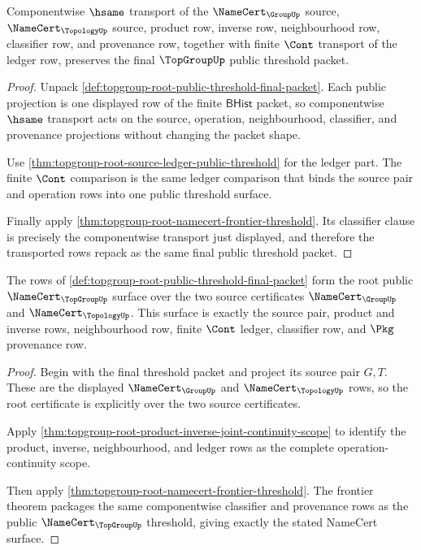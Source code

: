 \begin{theorem}
\label{thm:topgroup-root-public-threshold-transport}
Componentwise $\hsame$ transport of the $\NameCert_{\GroupUp}$ source,
$\NameCert_{\TopologyUp}$ source, product row, inverse row, neighbourhood row,
classifier row, and provenance row, together with finite $\Cont$ transport of
the ledger row, preserves the final $\TopGroupUp$ public threshold packet.
\end{theorem}
\begin{proof}
Unpack \autoref{def:topgroup-root-public-threshold-final-packet}. Each public
projection is one displayed row of the finite $\mathsf{BHist}$ packet, so
componentwise $\hsame$ transport acts on the source, operation,
neighbourhood, classifier, and provenance projections without changing the
packet shape.

Use \autoref{thm:topgroup-root-source-ledger-public-threshold} for the ledger
part. The finite $\Cont$ comparison is the same ledger comparison that binds
the source pair and operation rows into one public threshold surface.

Finally apply \autoref{thm:topgroup-root-namecert-frontier-threshold}. Its
classifier clause is precisely the componentwise transport just displayed, and
therefore the transported rows repack as the same final public threshold
packet.
\end{proof}

\begin{theorem}
\label{thm:topgroup-root-public-threshold-namecert-surface}
The rows of
\autoref{def:topgroup-root-public-threshold-final-packet} form the root public
$\NameCert_{\TopGroupUp}$ surface over the two source certificates
$\NameCert_{\GroupUp}$ and $\NameCert_{\TopologyUp}$. This surface is exactly
the source pair, product and inverse rows, neighbourhood row, finite
$\Cont$ ledger, classifier row, and $\Pkg$ provenance row.
\end{theorem}
\begin{proof}
Begin with the final threshold packet and project its source pair
$G,T$. These are the displayed $\NameCert_{\GroupUp}$ and
$\NameCert_{\TopologyUp}$ rows, so the root certificate is explicitly over the
two source certificates.

Apply \autoref{thm:topgroup-root-product-inverse-joint-continuity-scope} to
identify the product, inverse, neighbourhood, and ledger rows as the complete
operation-continuity scope.

Then apply \autoref{thm:topgroup-root-namecert-frontier-threshold}. The
frontier theorem packages the same componentwise classifier and provenance rows
as the public $\NameCert_{\TopGroupUp}$ threshold, giving exactly the stated
NameCert surface.
\end{proof}


